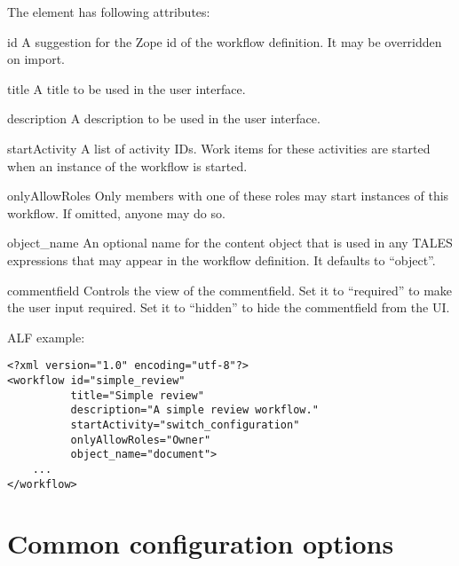 The  element has following attributes:

\begin{memberdesc}{id}
  A suggestion for the Zope id of the workflow definition. It may be
  overridden on import.
\end{memberdesc}

\begin{memberdesc}{title}
A title to be used in the user interface.
\end{memberdesc}

\begin{memberdesc}{description}
A description to be used in the user interface.
\end{memberdesc}

\begin{memberdesc}{startActivity}
A list of activity IDs. Work items for these activities
  are started when an instance of the workflow is started.
\end{memberdesc}

\begin{memberdesc}{onlyAllowRoles}
Only members with one of these roles may start instances
  of this workflow. If omitted, anyone may do so.
\end{memberdesc}

\begin{memberdesc}{object_name}
   An optional name for the content object that is used in any
  TALES expressions that may appear in the workflow definition. It defaults to
  ``object''.
\end{memberdesc}

\begin{memberdesc}{commentfield}
 Controls the view of the commentfield. Set it to ``required'' to make 
 the user input required. Set it to ``hidden'' to hide the commentfield 
 from the UI.
\end{memberdesc}

ALF example:

\begin{verbatim}
<?xml version="1.0" encoding="utf-8"?>
<workflow id="simple_review"
          title="Simple review"
          description="A simple review workflow."
          startActivity="switch_configuration"
          onlyAllowRoles="Owner"
          object_name="document">
    ...
</workflow>
\end{verbatim}

\section{Common configuration options}

